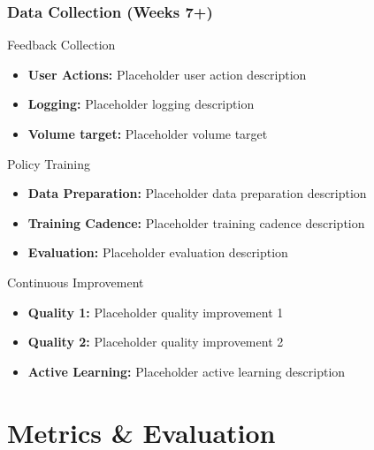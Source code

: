 \begin{frame}
\frametitle{Data Collection (Weeks 7+)}
\begin{block}{Feedback Collection}
\begin{itemize}
\item \textbf{User Actions:} Placeholder user action description
\item \textbf{Logging:} Placeholder logging description
\item \textbf{Volume target:} Placeholder volume target
\end{itemize}
\end{block}

\begin{block}{Policy Training}
\begin{itemize}
\item \textbf{Data Preparation:} Placeholder data preparation description
\item \textbf{Training Cadence:} Placeholder training cadence description
\item \textbf{Evaluation:} Placeholder evaluation description
\end{itemize}
\end{block}

\begin{block}{Continuous Improvement}
\begin{itemize}
\item \textbf{Quality 1:} Placeholder quality improvement 1
\item \textbf{Quality 2:} Placeholder quality improvement 2
\item \textbf{Active Learning:} Placeholder active learning description
\end{itemize}
\end{block}
\end{frame}

\section{Metrics \& Evaluation}\label{sec:metrics}

